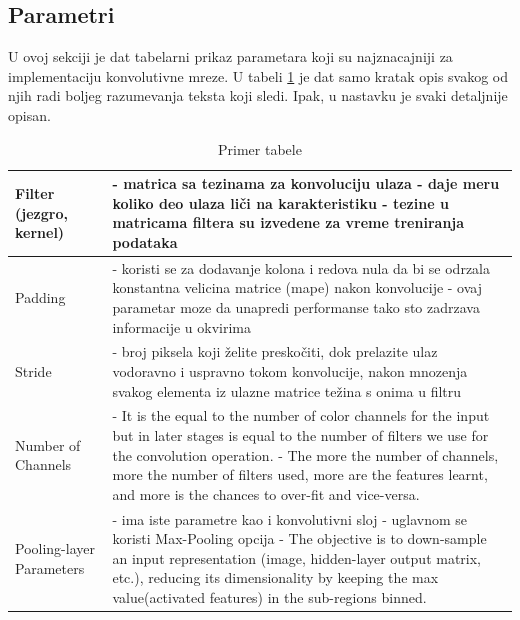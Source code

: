 \documentclass[a4paper]{article}
\begin{document}
\subsection{Parametri}

U ovoj sekciji je dat tabelarni prikaz parametara koji su najznacajniji za implementaciju konvolutivne mreze. U tabeli \ref{tabela_parametri} je dat samo kratak opis svakog od njih radi boljeg razumevanja teksta koji sledi. Ipak, u nastavku je svaki detaljnije opisan.

\begin{table}[h!]
\begin{center}
\caption{Primer tabele}
\begin{tabular}{|l|p{60mm}|}
\hline
Filter (jezgro, kernel) &
- matrica sa tezinama za konvoluciju ulaza \newline
- daje meru koliko deo ulaza liči na karakteristiku \newline
- tezine u matricama filtera su izvedene za vreme treniranja podataka
\\
\hline
Padding &
- koristi se za dodavanje kolona i redova nula da bi se odrzala konstantna velicina matrice (mape) nakon konvolucije \newline
- ovaj parametar moze da unapredi performanse tako sto zadrzava informacije u okvirima
\\
\hline 
Stride &
- broj piksela koji želite preskočiti, dok prelazite ulaz vodoravno i uspravno tokom konvolucije, nakon mnozenja svakog elementa iz ulazne matrice težina s onima u filtru
\\
\hline 
Number of Channels &
- It is the equal to the number of color channels for the input but in later stages is equal to the number of filters we use for the convolution operation. \newline
- The more the number of channels, more the number of filters used, more are the features learnt, and more is the chances to over-fit and vice-versa.
\\
\hline 
Pooling-layer Parameters &
- ima iste parametre kao i konvolutivni sloj \newline
- uglavnom se koristi Max-Pooling opcija \newline
- The objective is to down-sample an input representation (image, hidden-layer output matrix, etc.), reducing its dimensionality by keeping the max value(activated features) in the sub-regions binned.
\\
\hline 
\end{tabular}
\label{tabela_parametri}
\end{center}
\end{table}
\end{document}
